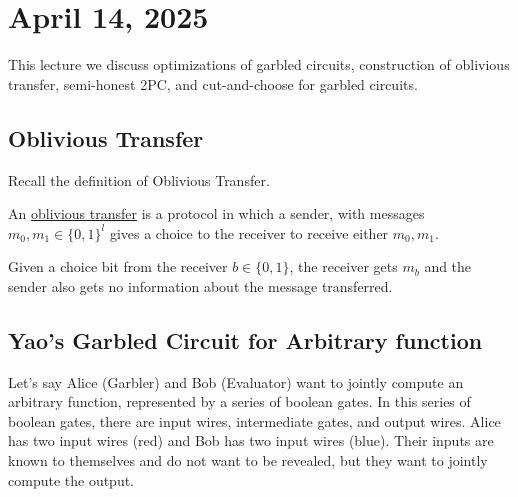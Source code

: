 \section{April 14, 2025}
\label{20250414}

This lecture we discuss optimizations of garbled circuits, construction of oblivious transfer, semi-honest 2PC, and cut-and-choose for garbled circuits.

\subsection{Oblivious Transfer}

Recall the definition of Oblivious Transfer.

\begin{definition}
    An \ul{oblivious transfer} is a protocol in which a sender, with messages $m_0, m_1\in\{0, 1\}^l$ gives a choice to the receiver to receive either $m_0, m_1$.

    Given a choice bit from the receiver $b\in\{0,1\}$, the receiver gets $m_b$ and the sender also gets no information about the message transferred.


\end{definition}

\subsection{Yao's Garbled Circuit for Arbitrary function}

Let's say Alice (Garbler) and Bob (Evaluator) want to jointly compute an arbitrary function, represented by a series of boolean gates. In this series of boolean gates, there are input wires, intermediate gates, and output wires. Alice has two input wires (red) and Bob has two input wires (blue). Their inputs are known to themselves and do not want to be revealed, but they want to jointly compute the output.

